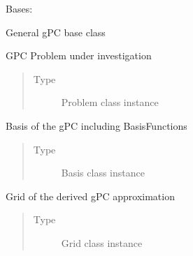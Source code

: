 \documentclass[letterpaper,10pt,english,openany,oneside]{sphinxmanual}
\begin{document}
\begin{fulllineitems}
\label{\detokenize{pygpc:pygpc.GPC.GPC}}
Bases: 

General gPC base class

\begin{fulllineitems}
\label{\detokenize{pygpc:pygpc.GPC.GPC.problem}}
GPC Problem under investigation
\begin{quote}\begin{description}
\item[{Type}] \leavevmode
Problem class instance

\end{description}\end{quote}

\end{fulllineitems}


\begin{fulllineitems}
\label{\detokenize{pygpc:pygpc.GPC.GPC.basis}}
Basis of the gPC including BasisFunctions
\begin{quote}\begin{description}
\item[{Type}] \leavevmode
Basis class instance

\end{description}\end{quote}

\end{fulllineitems}


\begin{fulllineitems}
\label{\detokenize{pygpc:pygpc.GPC.GPC.grid}}
Grid of the derived gPC approximation
\begin{quote}\begin{description}
\item[{Type}] \leavevmode
Grid class instance


\end{description}
\end{quote}
\end{fulllineitems}
\end{fulllineitems}
\end{document}
